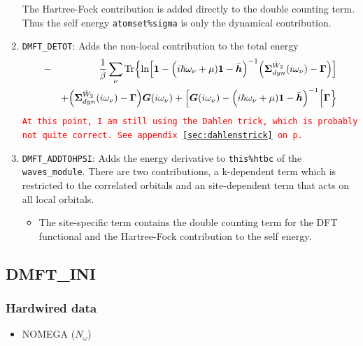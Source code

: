 \documentclass[11pt,a4paper]{report}
\newcommand{\petertt}[1]{\textcolor{red}{\texttt{#1}}}
\begin{document}
\begin{enumerate}
    The Hartree-Fock contribution is added directly to the double
  counting term. Thus the self energy \verb|atomset%sigma| is only
  the dynamical contribution.
%
\item \verb|DMFT_DETOT|: Adds the non-local contribution to the total energy
\begin{eqnarray}
&-&\frac{1}{\beta}\sum_\nu\mathrm{Tr}\Bigl\lbrace
\ln\Bigl[
\bm{1}-
\Bigl(i\hbar\omega_\nu+\mu)\bm{1}-\bar{\bm{h}}\Bigr)^{-1}
\Bigl(
\bm{\Sigma}^{\hat{W}_2}_{dyn}(i\omega_\nu)-\bm{\Gamma}\Bigr)
\Bigr]
\nonumber\\&&
+\Bigl(\bm{\Sigma}^{\hat{W}_2}_{dyn}(i\omega_\nu)
-\bm{\Gamma}\Bigr)\bm{G}(i\omega_\nu)
+
\Bigl[
\bm{G}(i\omega_\nu)
-\Bigl(i\hbar\omega_\nu+\mu)\bm{1}-\bar{\bm{h}}\Bigr)^{-1}
\Bigr[
\bm{\Gamma}\Bigr\rbrace
\end{eqnarray}
\petertt{At this point, I am still using the Dahlen trick, which is
  probably not quite correct. See appendix~\ref{sec:dahlenstrick} on
  p.~\pageref{sec:dahlenstrick} }
%
\item \verb|DMFT_ADDTOHPSI|: Adds the energy derivative to
  \verb|this%htbc| of the \verb|waves_module|. There are two
  contributions, a k-dependent term which is restricted to the
  correlated orbitals and an site-dependent term that acts on all
  local orbitals.
\begin{itemize}
\item The site-specific term contains the double counting term for the
  DFT functional and the Hartree-Fock contribution to the self energy.
\end{itemize}
\end{enumerate}



\subsection{DMFT\_INI}

\subsubsection{Hardwired data}
\begin{itemize}
\item NOMEGA ($N_\omega$)
\end{itemize}
\end{document}
